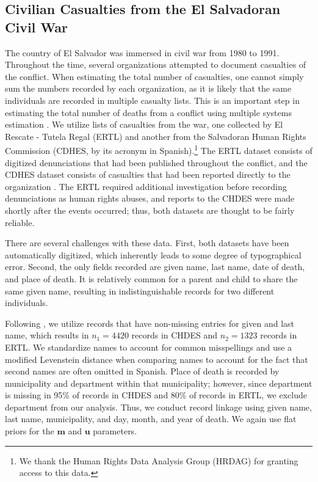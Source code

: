 \documentclass[ba]{imsart}
\begin{document}
	\subsection{Civilian Casualties from the El Salvadoran Civil War}
	\label{el_salvador}
	
	The country of El Salvador was immersed in civil war from 1980 to 1991. Throughout the time, several organizations attempted to document casualties of the conflict. When estimating the total number of casualties, one cannot simply sum the numbers recorded by each organization, as it is likely that the same individuals are recorded in multiple casualty lists. This is an important step in estimating the total number of deaths from a conflict using multiple systems estimation \citep{lum2013applications}. We utilize lists of casualties from the war, one collected by El Rescate - Tutela Regal (ERTL) and another from the Salvadoran Human Rights Commission (CDHES, by its acronym in Spanish).\footnote{We thank the Human Rights Data Analysis Group (HRDAG) for granting access to this data.} The ERTL dataset consists of digitized denunciations that had been published throughout the conflict, and the CDHES dataset consists of casualties that had been reported directly to the organization \citep{howland2008rescate, ball2000salvadoran}. The ERTL required additional investigation before recording denunciations as human rights abuses, and reports to the CHDES were made shortly after the events occurred; thus, both datasets are thought to be fairly reliable.
	
	There are several challenges with these data. First, both datasets have been automatically digitized, which inherently leads to some degree of typographical error. Second, the only fields recorded are given name, last name, date of death, and place of death. It is relatively common for a parent and child to share the same given name, resulting in indistinguishable records for two different individuals. 
	
	
	Following \cite{sadinle_bayesian_2017}, we utilize records that have non-missing entries for given and last name, which results in \(n_1 = 4420\) records in CHDES and \(n_2 = 1323\) records in ERTL. We standardize names to account for common misspellings and use a modified Levenstein distance when comparing names to account for the fact that second names are often omitted in Spanish. Place of death is recorded by municipality and department within that municipality; however, since department is missing in 95\% of records in CHDES and 80\% of records in ERTL, we exclude department from our analysis. Thus, we conduct record linkage using given name, last name, municipality, and day, month, and year of death. We again use flat priors for the \(\bm{m}\) and \(\bm{u}\) parameters.
	
\end{document}
